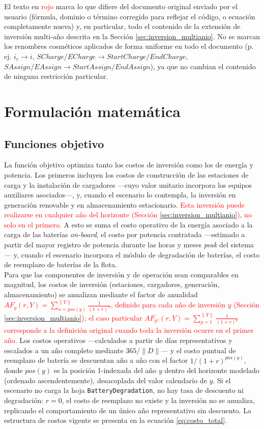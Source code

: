 \documentclass[11pt]{article}
\newcommand{\change}[1]{\textcolor{red}{#1}}
\begin{document}
El texto en \change{rojo} marca lo que difiere del documento original enviado por el usuario (fórmula, dominio o término corregido para reflejar el código, o ecuación completamente nueva) y, en particular, todo el contenido de la extensión de inversión multi-año descrita en la Sección \ref{sec:inversion_multianio}. No se marcan los renombres cosméticos aplicados de forma uniforme en todo el documento (p.\,ej. $i_c\to i$, $SCharge/ECharge\to StartCharge/EndCharge$, $SAssign/EAssign\to StartAssign/EndAssign$), ya que no cambian el contenido de ninguna restricción particular.

\section{Formulación matemática}

\subsection{Funciones objetivo}

La función objetivo optimiza tanto los costos de inversión como los de energía y potencia. Los primeros incluyen los costos de construcción de las estaciones de carga y la instalación de cargadores —cuyo valor unitario incorpora los equipos auxiliares asociados—, y, cuando el escenario lo contempla, la inversión en generación renovable y en almacenamiento estacionario. \change{Esta inversión puede realizarse en cualquier año del horizonte (Sección \ref{sec:inversion_multianio}), no solo en el primero.} A esto se suma el costo operativo de la energía asociado a la carga de las baterías \textit{on-board}, el costo por potencia contratada —estimado a partir del mayor registro de potencia durante las horas y meses \textit{peak} del sistema— y, cuando el escenario incorpora el módulo de degradación de baterías, el costo de reemplazo de baterías de la flota.\\

Para que las componentes de inversión y de operación sean comparables en magnitud, los costos de inversión (estaciones, cargadores, generación, almacenamiento) se anualizan mediante el factor de anualidad \change{$AF_y(r,Y)=\sum_{n=pos(y)}^{\|Y\|}\frac{1}{(1+r)^n}$, definido para cada año de inversión $y$ (Sección \ref{sec:inversion_multianio}); el caso particular $AF_{y^1}(r,Y)=\sum_{p=1}^{\|Y\|}\frac{1}{(1+r)^p}$ corresponde a la definición original cuando toda la inversión ocurre en el primer año.} Los costos operativos —calculados a partir de días representativos y escalados a un año completo mediante $365/\|D\|$— y el costo puntual de reemplazo de batería se descuentan año a año con el factor $1/(1+r)^{pos(y)}$, donde $pos(y)$ es la posición 1-indexada del año $y$ dentro del horizonte modelado (ordenado ascendentemente), desacoplada del valor calendario de $y$. Si el escenario no carga la hoja \texttt{BatteryDegradation}, no hay tasa de descuento ni degradación: $r=0$, el costo de reemplazo no existe y la inversión no se anualiza, replicando el comportamiento de un único año representativo sin descuento. La estructura de costos vigente se presenta en la ecuación \eqref{eq:costo_total}.
\end{document}
